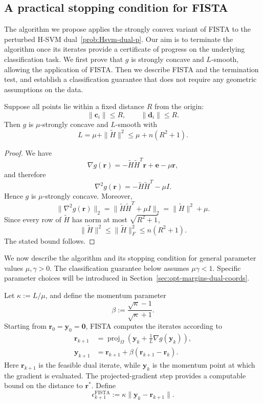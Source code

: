 \documentclass[twoside,11pt]{article}
\newcommand\bz{\bm{0}}
\renewcommand{\c}{\bm{c}}
\renewcommand{\d}{\bm{d}}
\renewcommand\r{\bm{r}}
\newcommand\y{\bm{y}}
\newcommand\e{\bm{e}}
\begin{document}
\subsection{A practical stopping condition for FISTA} \label{sec:practical-termination}
The algorithm we propose applies the strongly convex variant of FISTA \citep[Chapter 7]{Beck2017} to the perturbed H-SVM dual~\eqref{prob:Hsvm-dual-p}. Our aim is to terminate the algorithm once its iterates provide a certificate of progress on the underlying classification task. We first prove that $g$ is strongly concave and $L$-smooth, allowing the application of FISTA. Then we describe FISTA and the termination test, and establish a classification guarantee that does not require any geometric assumptions on the data.
\begin{theorem} \label{thm:Hsvm-smooth}
    Suppose all points lie within a fixed distance $R$ from the origin:
    \[
        \|\c_i\|\leq R,\qquad \|\d_i\|\leq R.
    \]
    Then $g$ is $\mu$-strongly concave and $L$-smooth with
    \[
      L = \mu+\|\tilde H\|^2 \leq \mu+n(R^2+1).
    \]
\end{theorem}

\begin{proof}
    We have
    \[
        \nabla g(\r) = -\tilde H\tilde H^T\r+\e-\mu\r,
    \]
    and therefore
    \[
        \nabla^2 g(\r) = -\tilde H\tilde H^T-\mu I.
    \]
    Hence $g$ is $\mu$-strongly concave. Moreover,
    \[
        \|\nabla^2 g(\r)\|_2 = \|\tilde H\tilde H^T+\mu I\|_2 = \|\tilde H\|^2+\mu.
    \]
    Since every row of $\tilde H$ has norm at most $\sqrt{R^2+1}$,
    \[
        \|\tilde H\|^2 \leq \|\tilde H\|_F^2 \leq n(R^2+1).
    \]
    The stated bound follows.
\end{proof}


We now describe the algorithm and its stopping condition for general parameter values $\mu,\gamma > 0$. The classification guarantee below assumes $\mu\gamma<1$. Specific parameter choices will be introduced in Section~\ref{sec:opt-margins-dual-coords}.

Let $\kappa := L/\mu$, and define the momentum parameter
\[
    \beta := \frac{\sqrt{\kappa}-1}{\sqrt{\kappa}+1}.
\]
Starting from
$\r_0=\y_0 = \bz$, FISTA computes the iterates according to
\begin{align}
    \r_{k+1} &= \operatorname{proj}_{\Omega}\left(\y_k + \frac{1}{L}\nabla g(\y_k)\right),\label{eqn:FISTA-projected-step}\\
    \y_{k+1} &= \r_{k+1} + \beta(\r_{k+1}-\r_k).\label{eqn:FISTA-momentum}
\end{align}
Here $\r_{k+1}$ is the feasible dual iterate, while $\y_k$ is the momentum point at which the gradient is evaluated. The projected-gradient step provides a computable bound on the distance to $\r^*$. Define
\begin{equation}
    \epsilon_{k+1}^{\mathrm{FISTA}}
    :=
    \kappa
    \|\y_k-\r_{k+1}\|.
    \label{eqn:Hsvm-FISTA-epsilon}
\end{equation}
\end{document}
